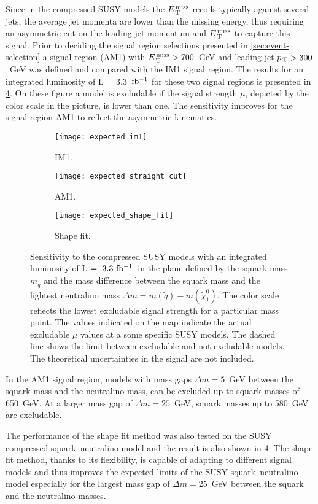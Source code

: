 Since in the compressed SUSY models the $E_\mathrm{\, T}^\mathrm{\, miss}$ recoils typically against several
jets, the average jet momenta are lower than the missing energy, thus requiring
an asymmetric cut on the leading jet momentum and $E_\mathrm{\, T}^\mathrm{\, miss}$ to capture this
signal. Prior to deciding the signal region selections presented in
\cref{sec:event-selection} a signal region (AM1) with $E_\mathrm{\, T}^\mathrm{\, miss} > 700$~GeV and
leading jet $p_\mathrm{\, T} > 300$~GeV was defined and compared with the IM1 signal
region. The results for an integrated luminosity of L = 3.3~$\mbox{fb$^{-1}$}$ for these two
signal regions is presented in \cref{fig:im1_straight_comparison}. On these
figure a model is excludable if the signal strength $\mu$, depicted by the color
scale in the picture, is lower than one. The sensitivity improves for the signal
region AM1 to reflect the asymmetric kinematics.
\begin{figure}[!h]
  \centering
  \begin{subfigure}[t]{.48\linewidth}
    \texttt{[image: expected\_im1]}
    \caption{IM1.}
    \label{fig:expected_im1}
  \end{subfigure}
  \begin{subfigure}[t]{.48\linewidth}
    \texttt{[image: expected\_straight\_cut]}
    \caption{AM1.}
    \label{fig:expected_straight}
  \end{subfigure}

  \begin{subfigure}[t]{.48\linewidth}
    \texttt{[image: expected\_shape\_fit]}
    \caption{Shape fit.}
    \label{fig:expected_shape}
  \end{subfigure}
  \caption{Sensitivity to the compressed SUSY models with an integrated
    luminosity of L$~=~3.3~\mbox{fb$^{-1}$}$~in the plane defined by the squark mass
    $m_{\tilde{q}}$ and the mass difference between the squark mass and the
    lightest neutralino mass
    $\Delta m = m(\tilde{q}) - m(\tilde{\chi}_{1}^{0})$. The color scale
    reflects the lowest excludable signal strength for a particular mass
    point. The values indicated on the map indicate the actual excludable $\mu$
    values at a some specific SUSY models. The dashed line shows the limit
    between excludable and not excludable models. The theoretical uncertainties
    in the signal are not included.}
  \label{fig:im1_straight_comparison}
\end{figure}

In the AM1 signal region, models with mass gaps $\Delta m = 5$~GeV between the
squark mass and the neutralino mass, can be excluded up to squark masses of
650~GeV. At a larger mass gap of $\Delta m = 25$~GeV, squark masses up to
580~GeV are excludable.

The performance of the shape fit method was also tested on the SUSY compressed
squark--neutralino model and the result is also shown in
\cref{fig:im1_straight_comparison}. The shape fit method, thanks to its
flexibility, is capable of adapting to different signal models and thus improves
the expected limits of the SUSY squark--neutralino model especially for the
largest mass gap of $\Delta m = 25$~GeV between the squark and the neutralino
masses.
